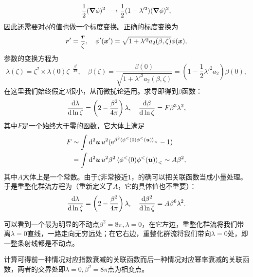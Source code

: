 \documentclass[hyperref, UTF8, a4paper]{ctexart}
\newcommand*{\ee}{\mathrm{e}}
\begin{document}
\[
    \frac{1}{2} (\grad{\phi})^2 \longrightarrow \frac{1}{2} (1 + \lambda'^2) (\grad{\phi})^2,
\]
因此还需要对$\phi$的值也做一个标度变换。正确的标度变换为
\[
    \vb*{r}' = \frac{\vb*{r}}{\zeta}, \quad \phi'(\vb*{x}') = \sqrt{1 + \lambda'^2 a_2(\beta, \zeta)} \phi(\vb*{x}),
\]
参数的变换方程为
\[
    \lambda(\zeta) = \zeta^2 \times \lambda(0) \zeta^{-\frac{\beta^2}{4\pi}}, \quad \beta(\zeta) = \frac{\beta(0)}{\sqrt{1 + \lambda'^2 a_2(\beta, \zeta)}} = (1 - \frac{1}{2} \lambda'^2 a_2) \beta(0),
\]
在这里我们始终假定$\lambda$很小，从而微扰论适用。求导即得到$\beta$函数：
\[
    \dv{\lambda}{\ln \zeta} = \left( 2 - \frac{\beta^2}{4\pi} \right) \lambda, \quad \dv{\beta}{\ln \zeta} = F \beta^3 \lambda^2,
\]
其中$F$是一个始终大于零的函数，它大体上满足
\[
    \begin{aligned}
        F &\sim \int \dd[2]{\vb*{u}} u^2 (\ee^{\beta^2 \expval*{\phi^<(0) \phi^<(\vb*{u})}_<} - 1) \\
        &= \int \dd[2]{\vb*{u}} u^2 \beta^2 \expval*{\phi^<(0) \phi^<(\vb*{u})}_< \sim A \beta^2,
    \end{aligned}
\]
其中$A$大体上是一个常数。由于$\zeta$非常接近$1$，的确可以把关联函数当成小量处理。
于是重整化群流方程为（重新定义了$A$，它的具体值也不重要）：
\begin{equation}
    \dv{\lambda}{\ln \zeta} = \left( 2 - \frac{\beta^2}{4\pi} \right) \lambda, \quad \dv{\beta^2}{\ln \zeta} = A \beta^6 \lambda^2.
\end{equation}


可以看到一个最为明显的不动点$\beta^2=8 \pi, \lambda=0$，在它左边，重整化群流将我们带离$\lambda=0$直线，一路走向无穷远处；在它右边，重整化群流将我们带向$\lambda=0$处，即一整条射线都是不动点。

计算可得前一种情况对应指数衰减的关联函数而后一种情况对应幂率衰减的关联函数，两者的交界处即$\lambda=0, \beta^2=8\pi$点为相变点。


\end{document}
